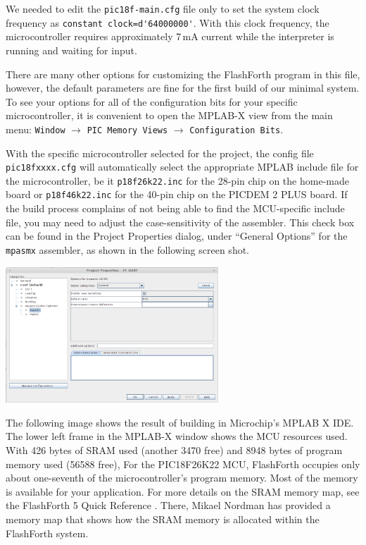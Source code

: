 \documentclass[12pt,a4paper]{article}
\begin{document}
\medskip\noindent
We needed to edit the \verb!pic18f-main.cfg! file only to set the system clock frequency
as \verb!constant clock=d'64000000'!.
With this clock frequency, the microcontroller requires approximately 7\,mA current while
the interpreter is running and waiting for input.

\medskip\noindent
There are many other options for customizing the FlashForth program in this file,
however, the default parameters are fine for the first build of our minimal system.
To see your options for all of the configuration bits for your specific microcontroller, 
it is convenient to open the MPLAB-X view from the main menu:
\verb!Window! $\rightarrow$ \verb!PIC Memory Views! $\rightarrow$ \verb!Configuration Bits!.


\medskip\noindent
With the specific microcontroller selected for the project, the config file
\verb!pic18fxxxx.cfg! will automatically select the appropriate MPLAB include file for 
the microcontroller, be it \verb!p18f26k22.inc! for the 28-pin chip on the home-made board
or \verb!p18f46k22.inc! for the 40-pin chip on the PICDEM 2 PLUS board.
If the build process complains of not being able to find the MCU-specific include file,
you may need to adjust the case-sensitivity of the assembler.
This check box can be found in the Project Properties dialog, 
under ``General Options'' for the \verb!mpasmx! assembler, as shown in the following screen shot. 

\bigskip
\noindent
\begin{center}
\includegraphics[width=0.6\textwidth]{../figs/MPLAB-X-mpasm-case-sensitivity.png}
\end{center}

\medskip\noindent
The following image shows the result of building in Microchip's MPLAB X IDE.
The lower left frame in the MPLAB-X window shows the MCU resources used.
With 426 bytes of SRAM used (another 3470 free) and 
8948 bytes of program memory used (56588 free),
For the PIC18F26K22 MCU, FlashForth occupies only about one-seventh of 
the microcontroller's program memory.
Most of the memory is available for your application.
For more details on the SRAM memory map, 
see the FlashForth 5 Quick Reference \cite{jacobs_2016b}.
There, Mikael Nordman has provided a memory map that shows how
the SRAM memory is allocated within the FlashForth system. 
\end{document}
